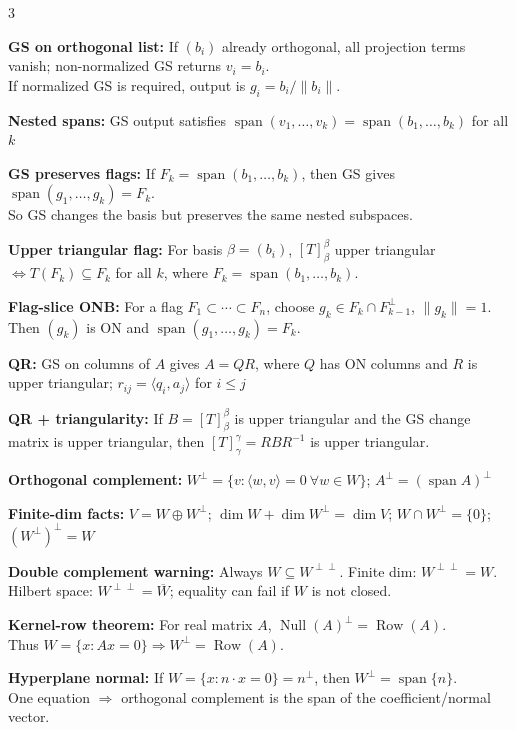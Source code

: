 \documentclass[10pt]{article}
\newcommand{\Null}{\operatorname{Null}}
\newcommand{\Row}{\operatorname{Row}}
\newcommand{\spann}{\operatorname{span}}
\newcommand{\ip}[2]{\langle #1,#2\rangle}
\newenvironment{cheatitems}{\par\vspace{-1pt}}{\par\vspace{-1pt}}
\newcommand{\cheatrow}[2]{%
  \par\noindent\textbf{#1:}\nobreak\enspace #2\par
}
\begin{document}
\begin{multicols}{3}
\begin{cheatitems}
\cheatrow{GS on orthogonal list}{
If $(b_i)$ already orthogonal, all projection terms vanish; non-normalized GS returns $v_i=b_i$.\\
If normalized GS is required, output is $g_i=b_i/\|b_i\|$.
}

\cheatrow{Nested spans}{
GS output satisfies
$\spann(v_1,\dots,v_k)=\spann(b_1,\dots,b_k)$ for all $k$
}

\cheatrow{GS preserves flags}{
If $F_k=\spann(b_1,\dots,b_k)$, then GS gives
$\spann(g_1,\dots,g_k)=F_k$.\\
So GS changes the basis but preserves the same nested subspaces.
}

\cheatrow{Upper triangular flag}{
For basis $\beta=(b_i)$, $[T]_\beta^\beta$ upper triangular
$\iff T(F_k)\subseteq F_k$ for all $k$, where 
$F_k=\spann(b_1,\dots,b_k)$.
}

\cheatrow{Flag-slice ONB}{
For a flag $F_1\subset\cdots\subset F_n$, choose
$g_k\in F_k\cap F_{k-1}^{\perp}$, $\|g_k\|=1$.\\
Then $(g_k)$ is ON and $\spann(g_1,\dots,g_k)=F_k$.
}

\cheatrow{QR}{
GS on columns of $A$ gives $A=QR$, where $Q$ has ON columns and $R$ is upper triangular;  
$r_{ij}=\ip{q_i}{a_j}$ for $i\le j$
}

\cheatrow{QR + triangularity}{
If $B=[T]_\beta^\beta$ is upper triangular and the GS change matrix is upper triangular, then
$[T]_\gamma^\gamma=RBR^{-1}$ is upper triangular.
}

\cheatrow{Orthogonal complement}{
$W^\perp=\{v:\ip{w}{v}=0\ \forall w\in W\}$;  
$A^\perp=(\spann A)^\perp$
}

\cheatrow{Finite-dim facts}{
$V=W\oplus W^\perp$; $\dim W+\dim W^\perp=\dim V$;  
$W\cap W^\perp=\{0\}$; $(W^\perp)^\perp=W$
}

\cheatrow{Double complement warning}{
Always $W\subseteq W^{\perp\perp}$. Finite dim: $W^{\perp\perp}=W$.\\
Hilbert space: $W^{\perp\perp}=\overline W$; equality can fail if $W$ is not closed.
}

\cheatrow{Kernel-row theorem}{
For real matrix $A$, $\Null(A)^\perp=\Row(A)$.\\
Thus $W=\{x:Ax=0\}\Rightarrow W^\perp=\Row(A)$.
}

\cheatrow{Hyperplane normal}{
If $W=\{x:n\cdot x=0\}=n^\perp$, then $W^\perp=\spann\{n\}$.\\
One equation $\Rightarrow$ orthogonal complement is the span of the coefficient/normal vector.
}


\end{cheatitems}
\end{multicols}
\end{document}
